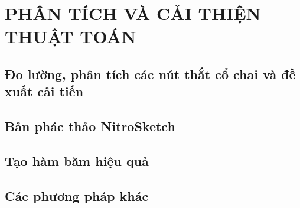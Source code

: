 \chapter{PHÂN TÍCH VÀ CẢI THIỆN THUẬT TOÁN}

\section{Đo lường, phân tích các nút thắt cổ chai và đề xuất cải tiến}

\section{Bản phác thảo NitroSketch}

\section{Tạo hàm băm hiệu quả}

\section{Các phương pháp khác}